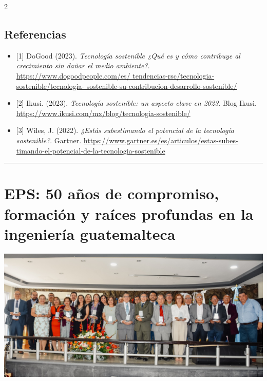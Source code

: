 \documentclass[12pt,spanish,Letterpaper,openany]{book}
\newcommand{\HRule}{\begin{center}\rule{0.5\linewidth}{0.2mm}\end{center}}
\begin{document}
\begin {multicols}{2}
\hypertarget{referencias-8}{%
\section{Referencias}\label{referencias-8}}

\begin{itemize}
\item
  {[}1{]} DoGood (2023). \emph{Tecnología sostenible ¿Qué es y cómo contribuye al crecimiento sin dañar el medio ambiente?}. \href{https://www.dogoodpeople.com/es/tendencias-rsc/tecnologia-sostenible/tecnologia-sostenible-su-contribucion-desarrollo-sostenible/}{https://www.dogoodpeople.com/es/
  tendencias-rsc/tecnologia-sostenible/tecnologia-
  sostenible-su-contribucion-desarrollo-sostenible/}
\item
  {[}2{]} Ikusi. (2023). \emph{Tecnología sostenible: un aspecto clave en 2023}. Blog Ikusi. \url{https://www.ikusi.com/mx/blog/tecnologia-sostenible/}
\item
  {[}3{]} Wiles, J. (2022). \emph{¿Estás subestimando el potencial de la tecnología sostenible?}. Gartner. \href{https://www.gartner.es/es/articulos/estas-subestimando-el-potencial-de-la-tecnologia-sostenible}{https://www.gartner.es/es/articulos/estas-subes-
  timando-el-potencial-de-la-tecnologia-sostenible}
\end{itemize}

\end {multicols}

\medskip

\HRule

\medskip

\hypertarget{eps50auxf1os}{%
\chapter{EPS: 50 años de compromiso, formación y raíces profundas en la ingeniería guatemalteca}\label{eps50auxf1os}}

\begin{center}\includegraphics[width=0.9\linewidth]{autores/art12} \end{center}
\end{document}
